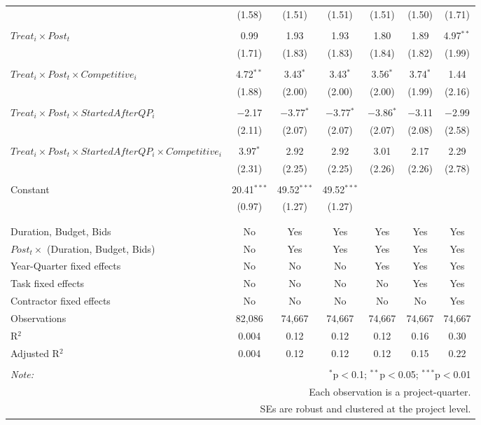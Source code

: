 \documentclass[
]{article}
\begin{document}
\begin{table}[H]
\begin{tabular}{@{\extracolsep{-3pt}}lcccccc}
  & (1.58) & (1.51) & (1.51) & (1.51) & (1.50) & (1.71) \\ 
  & & & & & & \\ 
 $Treat_i \times Post_t$ & 0.99 & 1.93 & 1.93 & 1.80 & 1.89 & 4.97$^{**}$ \\ 
  & (1.71) & (1.83) & (1.83) & (1.84) & (1.82) & (1.99) \\ 
  & & & & & & \\ 
 $Treat_i \times Post_t \times Competitive_i$ & 4.72$^{**}$ & 3.43$^{*}$ & 3.43$^{*}$ & 3.56$^{*}$ & 3.74$^{*}$ & 1.44 \\ 
  & (1.88) & (2.00) & (2.00) & (2.00) & (1.99) & (2.16) \\ 
  & & & & & & \\ 
 $Treat_i \times Post_t \times StartedAfterQP_i$ & $-$2.17 & $-$3.77$^{*}$ & $-$3.77$^{*}$ & $-$3.86$^{*}$ & $-$3.11 & $-$2.99 \\ 
  & (2.11) & (2.07) & (2.07) & (2.07) & (2.08) & (2.58) \\ 
  & & & & & & \\ 
 $Treat_i \times Post_t \times StartedAfterQP_i \times Competitive_i$ & 3.97$^{*}$ & 2.92 & 2.92 & 3.01 & 2.17 & 2.29 \\ 
  & (2.31) & (2.25) & (2.25) & (2.26) & (2.26) & (2.78) \\ 
  & & & & & & \\ 
 Constant & 20.41$^{***}$ & 49.52$^{***}$ & 49.52$^{***}$ &  &  &  \\ 
  & (0.97) & (1.27) & (1.27) &  &  &  \\ 
  & & & & & & \\ 
\hline \\[-1.8ex] 
Duration, Budget, Bids & No & Yes & Yes & Yes & Yes & Yes \\ 
$Post_t \times $  (Duration, Budget, Bids) & No & Yes & Yes & Yes & Yes & Yes \\ 
Year-Quarter fixed effects & No & No & No & Yes & Yes & Yes \\ 
Task fixed effects & No & No & No & No & Yes & Yes \\ 
Contractor fixed effects & No & No & No & No & No & Yes \\ 
Observations & 82,086 & 74,667 & 74,667 & 74,667 & 74,667 & 74,667 \\ 
R$^{2}$ & 0.004 & 0.12 & 0.12 & 0.12 & 0.16 & 0.30 \\ 
Adjusted R$^{2}$ & 0.004 & 0.12 & 0.12 & 0.12 & 0.15 & 0.22 \\ 
\hline 
\hline \\[-1.8ex] 
\textit{Note:}  & \multicolumn{6}{r}{$^{*}$p$<$0.1; $^{**}$p$<$0.05; $^{***}$p$<$0.01} \\ 
 & \multicolumn{6}{r}{Each observation is a project-quarter.} \\ 
 & \multicolumn{6}{r}{SEs are robust and clustered at the project level.} \\ 
\end{tabular} 
\end{table}
\end{document}

